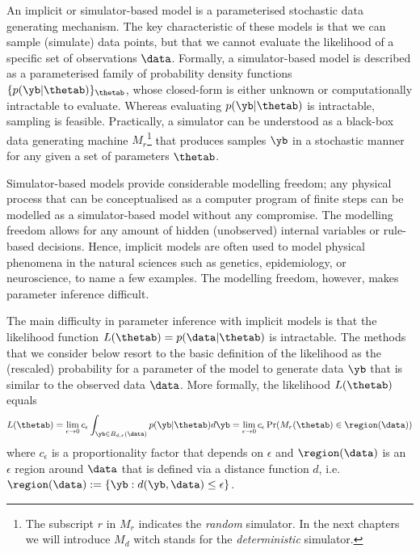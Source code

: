 An implicit or simulator-based model is a parameterised stochastic
data generating mechanism. The key characteristic
of these models is that we can sample (simulate) data points,
but that we cannot evaluate the likelihood of a specific set of observations
$\data$. Formally, a simulator-based model is described as a
parameterised family of probability density functions
$\{ p(\yb|\thetab) \}_{\thetab}$, whose closed-form is either
unknown or computationally intractable to evaluate. Whereas evaluating
$p(\yb|\thetab)$ is intractable, sampling is
feasible. Practically, a simulator can be understood as a black-box
data generating machine $M_r$\footnote{The subscript $r$ in $M_r$ indicates the
  \textit{random} simulator. In the next chapters we will introduce
  $M_d$ witch stands for the \textit{deterministic} simulator.} that
produces samples $\yb$ in a stochastic manner for any given a set of parameters $\thetab$.%

Simulator-based models provide considerable modelling freedom; any physical process that can be
conceptualised as a computer program of finite steps can be modelled
as a simulator-based model without any compromise. The modelling
freedom allows for any amount of hidden (unobserved) internal variables
or rule-based decisions. Hence, implicit models are often used to
model physical phenomena in the natural sciences such as genetics, epidemiology, or neuroscience, to name a few examples.
The modelling freedom, however, makes parameter inference difficult.

The main difficulty in parameter inference with implicit models is that the likelihood function
$L(\thetab) = p(\data|\thetab)$ is intractable. The methods that we consider below resort to the basic definition of the likelihood as the (rescaled) probability for a parameter of the model to generate data $\yb$ that is similar to the observed data $\data$. More formally, the likelihood $L(\thetab)$ equals
\begin{equation} \label{eq:likelihood}
  L(\thetab) = \lim_{\epsilon \to 0} c_\epsilon \int_{\yb \in B_{d,\epsilon}(\data)} p(\yb|\thetab)d\yb =
  \lim_{\epsilon \to 0} c_\epsilon \Pr(M_r(\thetab) \in \region(\data))
\end{equation}
%
where $c_\epsilon$ is a proportionality factor that depends on
$\epsilon$ and $\region(\data)$ is an $\epsilon$ region around $\data$ that is defined via a distance function $d$, i.e.\ $\region(\data) := \{\yb: d(\yb, \data) \leq \epsilon \}$. 

